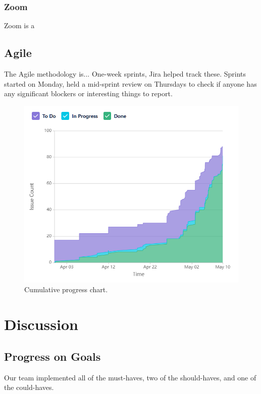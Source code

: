 \documentclass[conference]{IEEEtran}
\begin{document}
\subsubsection{Zoom}
Zoom is a 
\subsection{Agile}
The Agile methodology is...
One-week sprints, Jira helped track these. Sprints started on Monday, held a mid-sprint review on Thursdays to check if anyone has any significant blockers or interesting things to report.



\begin{figure}[htbp]
\centerline{\includegraphics[width = \linewidth]{cumulative-flow-diagram.png}}
\caption{Cumulative progress chart.}
\label{fig}
\end{figure}



\section{Discussion}

\subsection{Progress on Goals}
Our team implemented all of the must-haves, two of the should-haves, and one of the could-haves. 
\end{document}
